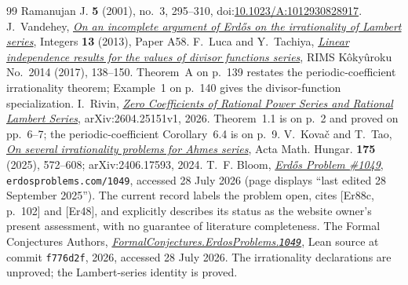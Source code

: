 \documentclass[11pt]{article}
\begin{document}
\begin{thebibliography}{99}
  Ramanujan J. \textbf{5} (2001), no.~3, 295--310,
  doi:\href{https://doi.org/10.1023/A:1012930828917}{10.1023/A:1012930828917}.
 J.~Vandehey,
  \href{https://arxiv.org/abs/1206.0340}{\emph{On an incomplete argument of
  Erd\H{o}s on the irrationality of Lambert series}},
  Integers \textbf{13} (2013), Paper A58.
 F.~Luca and Y.~Tachiya,
  \href{https://www.kurims.kyoto-u.ac.jp/~kyodo/kokyuroku/contents/pdf/2014-14.pdf}
  {\emph{Linear independence results for the values of divisor functions
  series}}, RIMS K\^oky\^uroku No.~2014 (2017), 138--150.
  Theorem~A on p.~139 restates the periodic-coefficient irrationality theorem;
  Example~1 on p.~140 gives the divisor-function specialization.
 I.~Rivin,
\href{https://arxiv.org/abs/2604.25151}{\emph{Zero Coefficients of Rational
  Power Series and Rational Lambert Series}}, arXiv:2604.25151v1, 2026.
  Theorem~1.1 is on p.~2 and proved on pp.~6--7; the periodic-coefficient
  Corollary~6.4 is on p.~9.
 V.~Kova\v{c} and T.~Tao,
  \href{https://arxiv.org/abs/2406.17593}{\emph{On several irrationality
  problems for Ahmes series}}, Acta Math. Hungar. \textbf{175} (2025),
  572--608; arXiv:2406.17593, 2024.
 T.~F. Bloom,
  \href{https://www.erdosproblems.com/1049}{\emph{Erd\H{o}s Problem \#1049}},
  \texttt{erdosproblems.com/1049}, accessed 28 July 2026
  (page displays ``last edited 28 September 2025'').  The current record
  labels the problem open, cites \textup{[Er88c, p.~102]} and \textup{[Er48]},
  and explicitly describes its status as the website owner's present
  assessment, with no guarantee of literature completeness.
 The Formal Conjectures Authors,
  \href{https://github.com/google-deepmind/formal-conjectures/blob/f776d2f2039351b00737ffcafb9d7d7666e1d9af/FormalConjectures/ErdosProblems/1049.lean}
  {\emph{FormalConjectures.ErdosProblems.\texttt{1049}}},
  Lean source at commit \texttt{f776d2f}, 2026, accessed 28 July 2026.  The
  irrationality declarations are unproved; the Lambert-series identity is
  proved.
\end{thebibliography}
\end{document}
